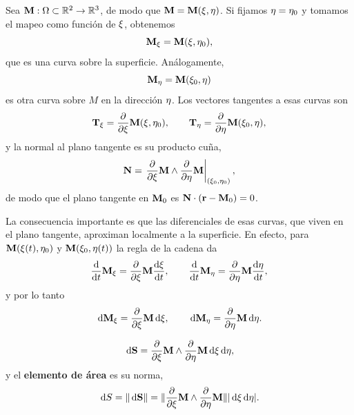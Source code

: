 Sea $\mathbf{M}:\Omega\subset\mathbb{R}^2\rightarrow\mathbb{R}^3$, de modo que
$\mathbf{M}=\mathbf{M}(\xi,\eta)$. Si fijamos $\eta=\eta_0$ y tomamos el mapeo como
funci\'on de $\xi$, obtenemos
\begin{equation}
  \label{eq:curva_xi}
  \mathbf{M}_{\xi}=\mathbf{M}(\xi,\eta_0),
\end{equation}
que es una curva sobre la superficie. An\'alogamente,
\begin{equation}
  \label{eq:curva_eta}
  \mathbf{M}_{\eta}=\mathbf{M}(\xi_0,\eta)
\end{equation}
es otra curva sobre $M$ en la direcci\'on $\eta$. Los vectores tangentes a esas
curvas son
\begin{equation}
  \label{eq:tangentes_superficie}
  \mathbf{T}_{\xi}=\frac{\partial }{\partial \xi}\mathbf{M}(\xi,\eta_0),
  \qquad
  \mathbf{T}_{\eta}=\frac{\partial }{\partial \eta}\mathbf{M}(\xi_0,\eta),
\end{equation}
y la normal al plano tangente es su producto cu\~na,
\begin{equation}
  \label{eq:normal_superficie}
  \mathbf{N}=\left. \frac{\partial }{\partial \xi}\mathbf{M}\wedge\frac{\partial }{\partial \eta}\mathbf{M} \right|
    _{(\xi_0,\eta_0)},
\end{equation}
de modo que el plano tangente en $\mathbf{M}_0$ es
$\mathbf{N}\cdot\left( \mathbf{r}-\mathbf{M}_0 \right)=0$.

La consecuencia importante es que las diferenciales de esas curvas, que viven
en el plano tangente, aproximan localmente a la superficie. En efecto, para
$\mathbf{M}(\xi(t),\eta_0)$ y $\mathbf{M}(\xi_0,\eta(t))$ la regla de la cadena da
\begin{equation}
  \label{eq:derivadas_curvas_superficie}
  \frac{\mathrm{d}}{\mathrm{d}t}\mathbf{M}_{\xi}=\frac{\partial }{\partial \xi}\mathbf{M}\frac{\mathrm{d}\xi}{\mathrm{d}t},
  \qquad
  \frac{\mathrm{d}}{\mathrm{d}t}\mathbf{M}_{\eta}=\frac{\partial }{\partial \eta}\mathbf{M}\frac{\mathrm{d}\eta}{\mathrm{d}t},
\end{equation}
y por lo tanto
\begin{equation}
  \label{eq:diferenciales_curvas}
  \,\mathrm{d}\mathbf{M}_{\xi}=\frac{\partial }{\partial \xi}\mathbf{M}\,\mathrm{d}\xi,
  \qquad
  \,\mathrm{d}\mathbf{M}_{\eta}=\frac{\partial }{\partial \eta}\mathbf{M}\,\mathrm{d}\eta .
\end{equation}

\begin{definicion}
  \label{def:dS}
  \begin{equation}
    \label{eq:dS}
    \,\mathrm{d}\mathbf{S}=\frac{\partial }{\partial \xi}\mathbf{M}\wedge\frac{\partial }{\partial \eta}\mathbf{M}
      \,\mathrm{d}\xi\,\mathrm{d}\eta ,
  \end{equation}
  y el \textbf{elemento de \'area} es su norma,
  \begin{equation}
    \label{eq:dS_norma}
    \,\mathrm{d} S=\lVert \,\mathrm{d}\mathbf{S} \rVert
      =\lVert \frac{\partial }{\partial \xi}\mathbf{M}\wedge\frac{\partial }{\partial \eta}\mathbf{M} \rVert
       \lvert \,\mathrm{d}\xi\,\mathrm{d}\eta \rvert .
  \end{equation}
\end{definicion}

